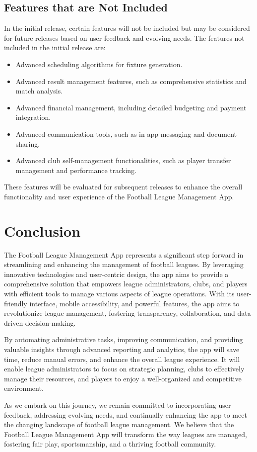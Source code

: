\documentclass[12pt]{article}
\begin{document}
\subsection{ Features that are Not Included }
In the initial release, certain features will not be included but may be considered for future releases based on user feedback and evolving needs. The features not included in the initial release are:
\begin{itemize}
    \item Advanced scheduling algorithms for fixture generation.
    \item Advanced result management features, such as comprehensive statistics and match analysis.
    \item Advanced financial management, including detailed budgeting and payment integration.
    \item Advanced communication tools, such as in-app messaging and document sharing.
    \item Advanced club self-management functionalities, such as player transfer management and performance tracking.
\end{itemize}
These features will be evaluated for subsequent releases to enhance the overall functionality and user experience of the Football League Management App.


\section{Conclusion}
The Football League Management App represents a significant step forward in streamlining and enhancing the management of football leagues. By leveraging innovative technologies and user-centric design, the app aims to provide a comprehensive solution that empowers league administrators, clubs, and players with efficient tools to manage various aspects of league operations. With its user-friendly interface, mobile accessibility, and powerful features, the app aims to revolutionize league management, fostering transparency, collaboration, and data-driven decision-making.

By automating administrative tasks, improving communication, and providing valuable insights through advanced reporting and analytics, the app will save time, reduce manual errors, and enhance the overall league experience. It will enable league administrators to focus on strategic planning, clubs to effectively manage their resources, and players to enjoy a well-organized and competitive environment.

As we embark on this journey, we remain committed to incorporating user feedback, addressing evolving needs, and continually enhancing the app to meet the changing landscape of football league management. We believe that the Football League Management App will transform the way leagues are managed, fostering fair play, sportsmanship, and a thriving football community.
\end{document}
